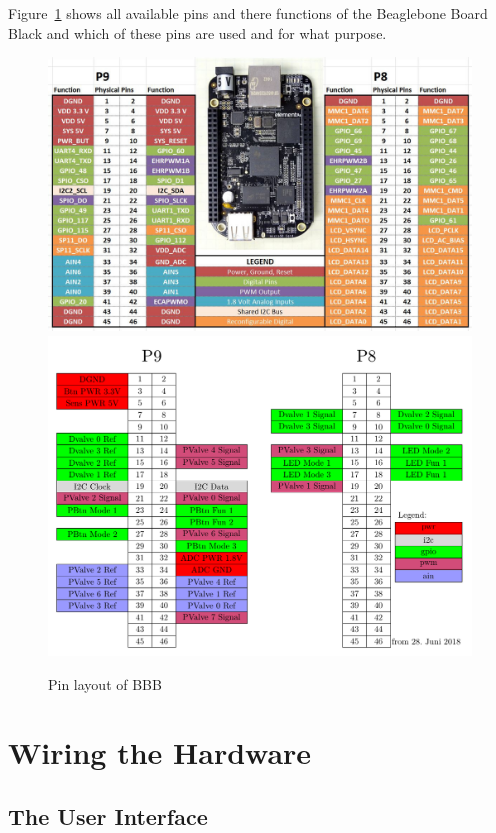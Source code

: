 \documentclass[
	fontsize=10pt
	paper=a4
]{scrartcl}
\begin{document}
Figure~\ref{fig:BBBpins} shows all available pins and there functions of the Beaglebone Board Black and which of these pins are used and for what purpose.
\begin{figure}[h!]
\begin{center}
\includegraphics[width=.8\textwidth]{Images/beaglebone-black-pinout.jpg} \\
\includegraphics[width=.9\textwidth]{Images/PinLayout/PinLayout.pdf}
\caption{Pin layout of BBB}
\label{fig:BBBpins}
\end{center}
\end{figure}


\section{Wiring the Hardware}

\subsection{The User Interface}
\end{document}
